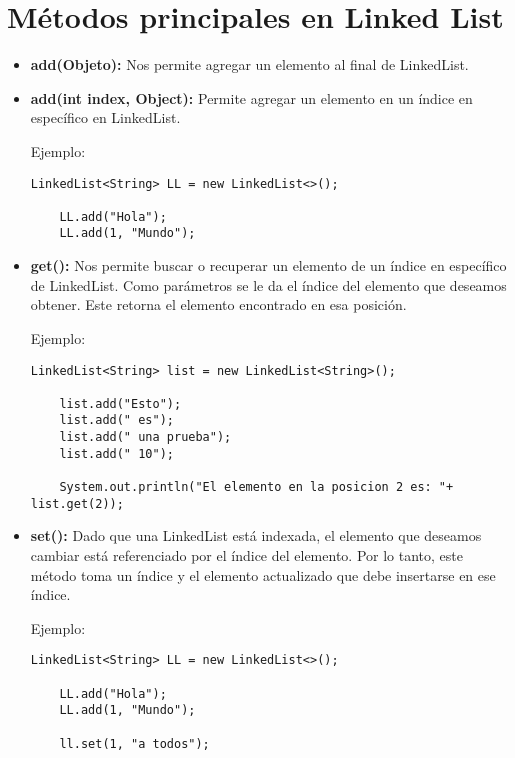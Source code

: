 \documentclass[12pt, letterpaper]{article} %
\begin{document}
\section*{Métodos principales en Linked List}
\begin{itemize}
    \item \textbf{add(Objeto):} Nos permite agregar un elemento al final de LinkedList.
    
    \item \textbf{add(int index, Object):} Permite agregar un elemento en un índice en específico en LinkedList.
    
    \lstset{language = Java, breaklines=true, basicstyle=\footnotesize}
    Ejemplo:
    \begin{lstlisting}[frame=single]
    LinkedList<String> LL = new LinkedList<>();

    LL.add("Hola");  
    LL.add(1, "Mundo");
    \end{lstlisting}
    
    \item \textbf{get():} Nos permite buscar o recuperar un elemento de un índice en específico de LinkedList. Como parámetros se le da el índice del elemento que deseamos obtener. Este retorna el elemento encontrado en esa posición.
    
    Ejemplo:
    \lstset{language = Java, breaklines=true, basicstyle=\footnotesize}
    \begin{lstlisting}[frame=single]
    LinkedList<String> list = new LinkedList<String>();

    list.add("Esto");
    list.add(" es");
    list.add(" una prueba");
    list.add(" 10");

    System.out.println("El elemento en la posicion 2 es: "+ list.get(2));
    \end{lstlisting}
    
    \item \textbf{set():} Dado que una LinkedList está indexada, el elemento que deseamos cambiar está referenciado por el índice del elemento. Por lo tanto, este método toma un índice y el elemento actualizado que debe insertarse en ese índice.

    Ejemplo:
    \lstset{language = Java, breaklines=true, basicstyle=\footnotesize}
    \begin{lstlisting}[frame=single]
    LinkedList<String> LL = new LinkedList<>();

    LL.add("Hola");  
    LL.add(1, "Mundo");

    ll.set(1, "a todos");
    \end{lstlisting}
    

\end{itemize}
\end{document}
